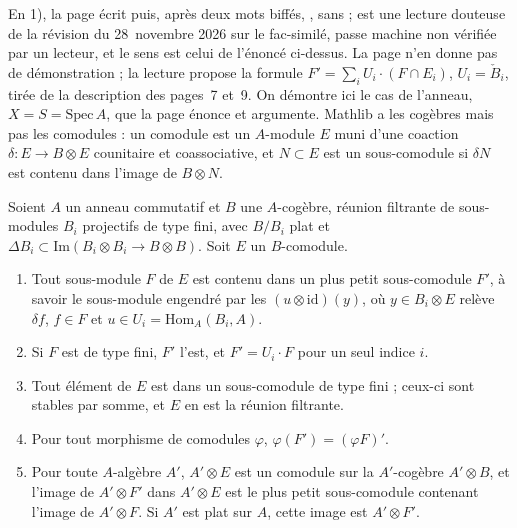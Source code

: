 \noindent En 1), la page écrit  puis, après deux mots biffés, , sans  ;  est une lecture douteuse de la révision du 28~novembre 2026 sur le fac-similé, passe machine non vérifiée par un lecteur, et le sens est celui de l'énoncé ci-dessus. La page n'en donne pas de démonstration ; la lecture propose la formule $F' = \sum_i U_i \cdot (F \cap E_i)$, $U_i = \check B_i$, tirée de la description des pages~7 et~9. On démontre ici le cas de l'anneau, $X = S = \mathrm{Spec}\,A$, que la page énonce et argumente. Mathlib a les cogèbres mais pas les comodules : un comodule est un $A$-module $E$ muni d'une coaction $\delta \colon E \to B \otimes E$ counitaire et coassociative, et $N \subset E$ est un sous-comodule si $\delta N$ est contenu dans l'image de $B \otimes N$.

\begin{encadre}
\begin{enonce}
Soient $A$ un anneau commutatif et $B$ une $A$-cogèbre, réunion filtrante de sous-modules $B_i$ projectifs de type fini, avec $B/B_i$ plat et $\Delta B_i \subset \mathrm{Im}(B_i \otimes B_i \to B \otimes B)$. Soit $E$ un $B$-comodule.
\begin{enumerate}
  \item Tout sous-module $F$ de $E$ est contenu dans un plus petit sous-comodule $F'$, à savoir le sous-module engendré par les $(u \otimes \mathrm{id})(y)$, où $y \in B_i \otimes E$ relève $\delta f$, $f \in F$ et $u \in U_i = \mathrm{Hom}_A(B_i, A)$.
  \item Si $F$ est de type fini, $F'$ l'est, et $F' = U_i \cdot F$ pour un seul indice $i$.
  \item Tout élément de $E$ est dans un sous-comodule de type fini ; ceux-ci sont stables par somme, et $E$ en est la réunion filtrante.
  \item Pour tout morphisme de comodules $\varphi$, $\varphi(F') = (\varphi F)'$.
  \item Pour toute $A$-algèbre $A'$, $A' \otimes E$ est un comodule sur la $A'$-cogèbre $A' \otimes B$, et l'image de $A' \otimes F'$ dans $A' \otimes E$ est le plus petit sous-comodule contenant l'image de $A' \otimes F$. Si $A'$ est plat sur $A$, cette image est $A' \otimes F'$.
\end{enumerate}
\end{enonce}
\end{encadre}

